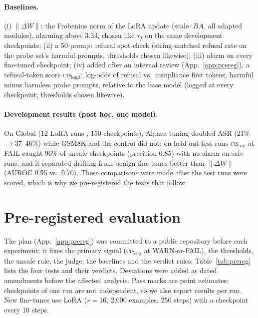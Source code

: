 \documentclass[11pt]{article}
\newcommand{\cissep}{\textsc{cis}$_{\text{sep}}$}
\newcommand{\dw}{$\lVert\Delta W\rVert$}
\begin{document}
\paragraph{Baselines.} (i) \dw{}: the Frobenius norm of the LoRA update ($\text{scale}\cdot BA$, all adapted modules),
alarming above 3.34, chosen like $\tau_f$ on the same development checkpoints; (ii) a 50-prompt refusal spot-check
(string-matched refusal rate on the probe set's harmful prompts, thresholds chosen likewise); (iii) alarm on every
fine-tuned checkpoint; (iv) added after an internal review (App.~\ref{app:prereg}), a refusal-token score
\textsc{cis}$_{\text{logit}}$: log-odds of refusal vs.\ compliance first tokens, harmful minus harmless probe prompts,
relative to the base model (logged at every checkpoint; thresholds chosen likewise).

\paragraph{Development results (post hoc, one model).} On Global (12 LoRA runs \citep{hu2021lora}, 150 checkpoints),
Alpaca tuning \citep{taori2023alpaca} doubled ASR (21\%$\rightarrow$37--46\%) while GSM8K \citep{cobbe2021gsm8k} and the control did not; on
held-out test runs \cissep{} at FAIL caught 96\% of unsafe checkpoints (precision 0.85) with no alarm on safe runs, and
it separated drifting from benign fine-tunes better than \dw{} (AUROC 0.95 vs.\ 0.70). These comparisons were made after
the test runs were scored, which is why we pre-registered the tests that follow.

\section{Pre-registered evaluation}
\label{sec:prereg}

The plan (App.~\ref{app:prereg}) was committed to a public repository before each experiment; it fixes the primary
signal (\cissep{} at WARN-or-FAIL), the thresholds, the unsafe rule, the judge, the baselines and the verdict rules;
Table~\ref{tab:prereg} lists the four tests and their verdicts.
Deviations were added as dated amendments before the affected analysis. Pass marks are point estimates; checkpoints of
one run are not independent, so we also report results per run. New fine-tunes use LoRA ($r=16$, 2{,}000 examples,
250 steps) with a checkpoint every 10 steps.
\end{document}
